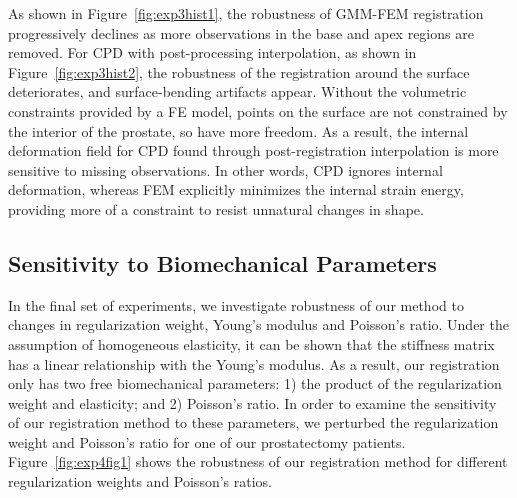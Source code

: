 \documentclass[journal]{IEEEtran}
\begin{document}
As shown in Figure~\ref{fig:exp3hist1}, the robustness of GMM-FEM registration progressively declines as more observations in the base and apex regions are removed. For CPD with post-processing interpolation, as shown in Figure~\ref{fig:exp3hist2}, the robustness of the registration around the surface deteriorates, and surface-bending artifacts appear. Without the volumetric constraints provided by a FE model, points on the surface are not constrained by the interior of the prostate, so have more freedom. As a result, the internal deformation field for CPD found through post-registration interpolation is more sensitive to missing observations. In other words, CPD ignores internal deformation, whereas FEM explicitly minimizes the internal strain energy, providing more of a constraint to resist unnatural changes in shape.
\subsection{Sensitivity to Biomechanical Parameters}\label{sec:exp3}
In the final set of experiments, we investigate robustness of our method to changes in regularization weight, Young's modulus and Poisson's ratio. Under the assumption of homogeneous elasticity, it can be shown that the stiffness matrix has a linear relationship with the Young's modulus. As a result, our registration only has two free biomechanical parameters: 1) the product of the regularization weight and elasticity; and 2) Poisson's ratio. In order to examine the sensitivity of our registration method to these parameters, we perturbed the regularization weight and Poisson's ratio for one of our prostatectomy patients. Figure~\ref{fig:exp4fig1} shows the robustness of our registration method for different regularization weights and Poisson's ratios.
\end{document}
